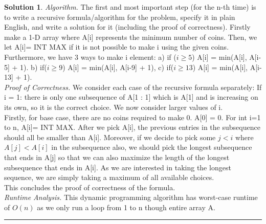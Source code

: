 \documentclass{article}
\theoremstyle{definition}
\def\fline{\rule{0.75\linewidth}{0.5pt}}
\newcommand{\finishline}{\begin{center}\fline\end{center}}
\newtheorem*{solution*}{Solution}
\newenvironment{solution}{\begin{solution*}}{{\finishline} \end{solution*}}
\begin{document}
	\begin{solution}
		
		\emph{Algorithm.}  The first and most important step (for the n-th time) is to write a recursive formula/algorithm for the problem, specify it in plain English, and write a solution for it (including the proof of correctness). Firstly make a 1-D array where A[i] represents the minimum number of coins. Then, we let A[i]= INT MAX if it is not possible to make i using the given coins. Furthermore, we have 3 ways to make i element: a) if ($i \geq 5$) A[i] = min(A[i], A[i-5] + 1). b) if($i \geq 9$) A[i] = min(A[i], A[i-9] + 1), c) if($i \geq 13$) A[i] = min(A[i], A[i-13] + 1). \\
		
		\emph{Proof of Correctness.} We consider each case of the recursive formula separately: If i = 1: there is only one subsequence of A[1 : 1] which is A[1] and is increasing on its own, so it is the correct choice. We now consider larger values of i. \\
		Firstly, for base case, there are no coins required to make 0. A[0] = 0. For int i=1 to n, A[i]= INT MAX. After we pick A[i], the previous entries in the subsequence should all be smaller than A[i]. Moreover, if we decide to pick some $j < i$ where $A[j] < A[i]$ in the subsequence also, we should pick the longest subsequence that ends in A[j] so that we can also maximize the length of the longest subsequence that ends in A[i]. As we are interested in taking the longest sequence, we are simply taking a maximum of all available choices. \\
This concludes the proof of correctness of the formula.\\
		
		\emph{Runtime Analysis.} This dynamic programming algorithm has worst-case runtime of $O(n)$ as we only run a loop from 1 to n though entire array A. \\
		
	\end{solution}
	

\smallskip
\end{document}

